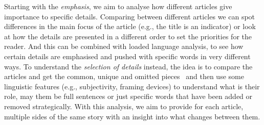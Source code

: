Starting with the \textit{emphasis}, we aim to analyse how different articles give importance to specific details. Comparing between different articles we can spot differences in the main focus of the article (e.g., the title is an indicator) or look at how the details are presented in a different order to set the priorities for the reader.
And this can be combined with loaded language analysis, to see how certain details are emphasised and pushed with specific words in very different ways.
To understand the \textit{selection of details} instead, the idea is to compare the articles and get the common, unique and omitted pieces~\cite{bountouridis2018explaining} and then use some linguistic features (e.g., subjectivity, framing devices) to understand what is their role, may them be full sentences or just specific words that have been added or removed strategically.
With this analysis, we aim to provide for each article, multiple sides of the same story with an insight into what changes between them.




